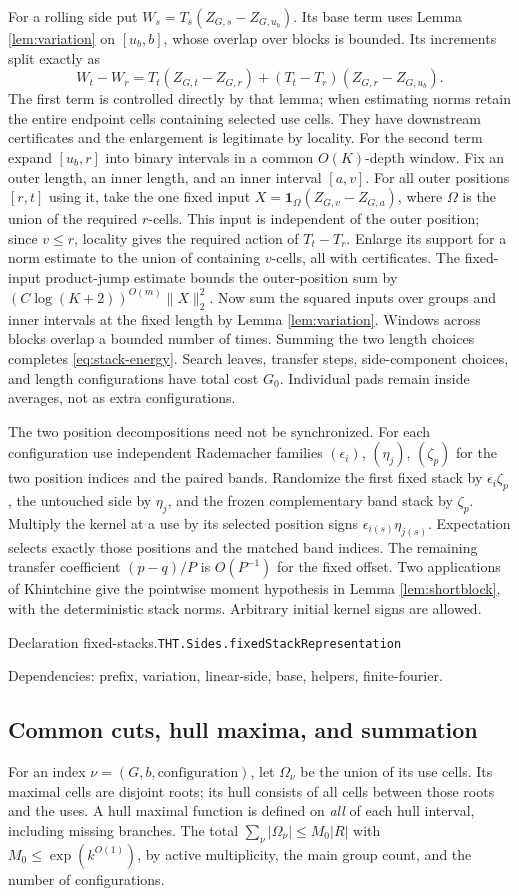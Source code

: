 \documentclass[11pt]{article}
\theoremstyle{definition}
\newcommand{\one}{\mathbf 1}
\numberwithin{equation}{section}
\newcommand{\bp}[3]{\par\smallskip\begingroup\footnotesize
\noindent\hypertarget{bp:#1}{\textsf{Declaration #1.}}\quad\nolinkurl{#2}\par
\noindent\textsf{Dependencies:} #3.\par\endgroup\smallskip}
\begin{document}
For a rolling side put $W_s=T_s(Z_{G,s}-Z_{G,u_b})$. Its base term uses Lemma \ref{lem:variation} on $[u_b,b]$, whose overlap over blocks is bounded. Its increments split exactly as
\[
 W_t-W_r=T_t(Z_{G,t}-Z_{G,r})+(T_t-T_r)(Z_{G,r}-Z_{G,u_b}).
\]
The first term is controlled directly by that lemma; when estimating norms retain the entire endpoint cells containing selected use cells. They have downstream certificates and the enlargement is legitimate by locality. For the second term expand $[u_b,r]$ into binary intervals in a common $O(K)$-depth window. Fix an outer length, an inner length, and an inner interval $[a,v]$. For all outer positions $[r,t]$ using it, take the one fixed input $X=\one_\Omega(Z_{G,v}-Z_{G,a})$, where $\Omega$ is the union of the required $r$-cells. This input is independent of the outer position; since $v\le r$, locality gives the required action of $T_t-T_r$. Enlarge its support for a norm estimate to the union of containing $v$-cells, all with certificates. The fixed-input product-jump estimate bounds the outer-position sum by $(C\log(K+2))^{O(m)}\|X\|_2^2$. Now sum the squared inputs over groups and inner intervals at the fixed length by Lemma \ref{lem:variation}. Windows across blocks overlap a bounded number of times. Summing the two length choices completes \eqref{eq:stack-energy}. Search leaves, transfer steps, side-component choices, and length configurations have total cost $G_0$. Individual pads remain inside averages, not as extra configurations.

The two position decompositions need not be synchronized. For each configuration use independent Rademacher families $(\epsilon_i)$, $(\eta_j)$, $(\zeta_p)$ for the two position indices and the paired bands. Randomize the first fixed stack by $\epsilon_i\zeta_p$, the untouched side by $\eta_j$, and the frozen complementary band stack by $\zeta_p$. Multiply the kernel at a use by its selected position signs $\epsilon_{i(s)}\eta_{j(s)}$. Expectation selects exactly those positions and the matched band indices. The remaining transfer coefficient $(p-q)/P$ is $O(P^{-1})$ for the fixed offset. Two applications of Khintchine give the pointwise moment hypothesis in Lemma \ref{lem:shortblock}, with the deterministic stack norms. Arbitrary initial kernel signs are allowed.

\bp{fixed-stacks}{THT.Sides.fixedStackRepresentation}{prefix, variation, linear-side, base, helpers, finite-fourier}

\subsection*{Common cuts, hull maxima, and summation}
For an index $\nu=(G,b,\text{configuration})$, let $\Omega_\nu$ be the union of its use cells. Its maximal cells are disjoint roots; its hull consists of all cells between those roots and the uses. A hull maximal function is defined on \emph{all} of each hull interval, including missing branches. The total $\sum_\nu|\Omega_\nu|\le M_0|R|$ with $M_0\le\exp(k^{O(1)})$, by active multiplicity, the main group count, and the number of configurations.
\end{document}
